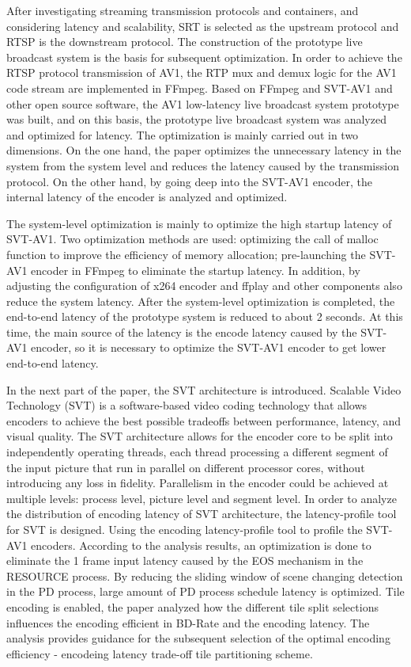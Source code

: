 \begin{bigabstract}
  After investigating streaming transmission protocols and containers, and considering latency and scalability, SRT is selected as the upstream protocol and RTSP is the downstream protocol. The construction of the prototype live broadcast system is the basis for subsequent optimization. In order to achieve the RTSP protocol transmission of AV1, the RTP mux and demux logic for the AV1 code stream are implemented in FFmpeg. Based on FFmpeg and SVT-AV1 and other open source software, the AV1 low-latency live broadcast system prototype was built, and on this basis, the prototype live broadcast system was analyzed and optimized for latency. The optimization is mainly carried out in two dimensions. On the one hand, the paper optimizes the unnecessary latency in the system from the system level and reduces the latency caused by the transmission protocol. On the other hand, by going deep into the SVT-AV1 encoder, the internal latency of the encoder is analyzed and optimized.

  The system-level optimization is mainly to optimize the high startup latency of SVT-AV1. Two optimization methods are used: optimizing the call of malloc function to improve the efficiency of memory allocation; pre-launching the SVT-AV1 encoder in FFmpeg to eliminate the startup latency. In addition, by adjusting the configuration of x264 encoder and ffplay and other components also reduce the system latency. After the system-level optimization is completed, the end-to-end latency of the prototype system is reduced to about 2 seconds. At this time, the main source of the latency is the encode latency caused by the SVT-AV1 encoder, so it is necessary to optimize the SVT-AV1 encoder to get lower end-to-end latency.

  In the next part of the paper, the SVT architecture is introduced. Scalable Video Technology (SVT) is a software-based video coding technology that allows encoders to achieve the best possible tradeoffs between performance, latency, and visual quality. The SVT architecture allows for the encoder core to be split into independently operating threads, each thread processing a different segment of the input picture that run in parallel on different processor cores, without introducing any loss in fidelity. Parallelism in the encoder could be achieved at multiple levels: process level, picture level and segment level. In order to analyze the distribution of encoding latency of SVT architecture, the latency-profile tool for SVT is designed. Using the encoding latency-profile tool to profile the SVT-AV1 encoders. According to the analysis results, an optimization is done to eliminate the 1 frame input latency caused by the EOS mechanism in the RESOURCE process. By reducing the sliding window of scene changing detection in the PD process, large amount of PD process schedule latency is optimized. Tile encoding is enabled, the paper analyzed how the different tile split selections influences the encoding efficient in BD-Rate and the encoding latency. The analysis provides guidance for the subsequent selection of the optimal encoding efficiency - encodeing latency trade-off tile partitioning scheme.


\end{bigabstract}
